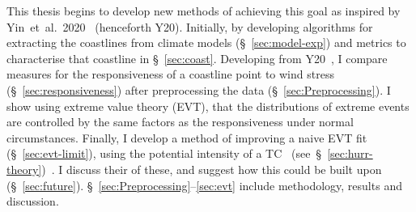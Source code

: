 This thesis begins to develop new methods of achieving this goal
as inspired by Yin~et~al.~2020~\cite{ZannaPreprint} (henceforth Y20).
Initially, by developing algorithms for extracting the coastlines from climate models (§~\ref{sec:model-exp})
and metrics to characterise that coastline in §~\ref{sec:coast}.
Developing from Y20~\cite{ZannaPreprint}, I compare measures for the
responsiveness of a coastline point to wind stress (§~\ref{sec:responsiveness})
after preprocessing the data (§~\ref{sec:Preprocessing}).
I show using extreme value theory (EVT), that the
distributions of extreme events are controlled by the same factors as
the responsiveness under normal circumstances.
Finally, I develop a
method of improving a naive EVT fit (§~\ref{sec:evt-limit}),
using the potential intensity of a TC~\cite{emanuel1999thermodynamic}
(see~§~\ref{sec:hurr-theory})~\cite{emanuel1987dependence,
 emanuel2016predictability}.
I discuss their of these,
and suggest how this could be built upon (§~\ref{sec:future}).
§~\ref{sec:Preprocessing}--\ref{sec:evt} include methodology,
results and discussion.
